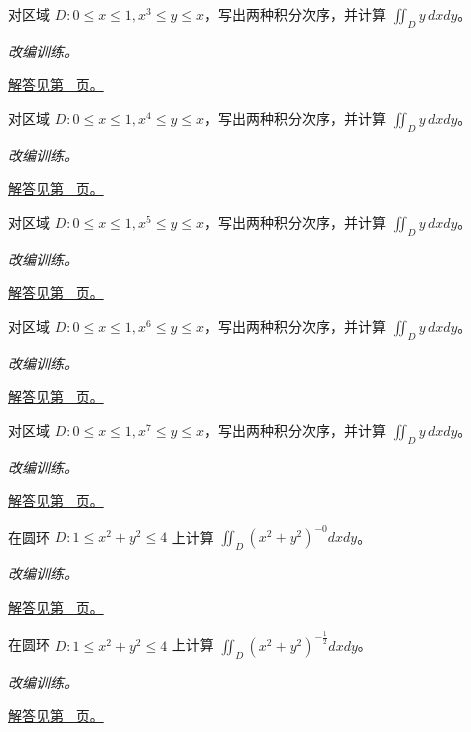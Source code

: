 \documentclass[12pt,fontset=fandol]{ctexart}
\begin{document}
\begin{example}[两条曲线之间的换序]\label{ex:c37q8}
对区域 $D:0\le x\le1, x^{3}\le y\le x$，写出两种积分次序，并计算 $\iint_Dy\,dxdy$。
\par\textit{改编训练。}\par\hyperref[ans:c37q8]{解答见第~\pageref{ans:c37q8} 页。}
\end{example}
\begin{example}[两条曲线之间的换序]\label{ex:c37q9}
对区域 $D:0\le x\le1, x^{4}\le y\le x$，写出两种积分次序，并计算 $\iint_Dy\,dxdy$。
\par\textit{改编训练。}\par\hyperref[ans:c37q9]{解答见第~\pageref{ans:c37q9} 页。}
\end{example}
\begin{example}[两条曲线之间的换序]\label{ex:c37q10}
对区域 $D:0\le x\le1, x^{5}\le y\le x$，写出两种积分次序，并计算 $\iint_Dy\,dxdy$。
\par\textit{改编训练。}\par\hyperref[ans:c37q10]{解答见第~\pageref{ans:c37q10} 页。}
\end{example}
\begin{example}[两条曲线之间的换序]\label{ex:c37q11}
对区域 $D:0\le x\le1, x^{6}\le y\le x$，写出两种积分次序，并计算 $\iint_Dy\,dxdy$。
\par\textit{改编训练。}\par\hyperref[ans:c37q11]{解答见第~\pageref{ans:c37q11} 页。}
\end{example}
\begin{example}[两条曲线之间的换序]\label{ex:c37q12}
对区域 $D:0\le x\le1, x^{7}\le y\le x$，写出两种积分次序，并计算 $\iint_Dy\,dxdy$。
\par\textit{改编训练。}\par\hyperref[ans:c37q12]{解答见第~\pageref{ans:c37q12} 页。}
\end{example}
\begin{example}[圆环上的径向负幂]\label{ex:c37q13}
在圆环 $D:1\le x^2+y^2\le4$ 上计算 $\iint_D(x^2+y^2)^{-0}dxdy$。
\par\textit{改编训练。}\par\hyperref[ans:c37q13]{解答见第~\pageref{ans:c37q13} 页。}
\end{example}
\begin{example}[圆环上的径向负幂]\label{ex:c37q14}
在圆环 $D:1\le x^2+y^2\le4$ 上计算 $\iint_D(x^2+y^2)^{-\frac{1}{2}}dxdy$。
\par\textit{改编训练。}\par\hyperref[ans:c37q14]{解答见第~\pageref{ans:c37q14} 页。}
\end{example}
\end{document}
